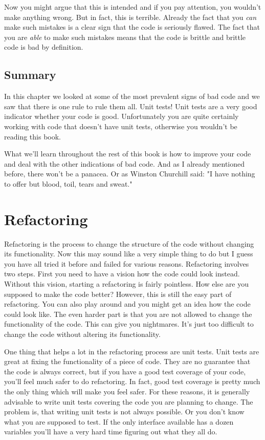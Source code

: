 Now you might argue that this is intended and if you pay attention, you wouldn't make anything wrong. But in fact, this is terrible. Already the fact that you \textit{can} make such mistakes is a clear sign that the code is seriously flawed. The fact that you are \textit{able} to make such mistakes means that the code is brittle and brittle code is bad by definition.

\section{Summary}

In this chapter we looked at some of the most prevalent signs of bad code and we saw that there is one rule to rule them all. Unit tests! Unit tests are a very good indicator whether your code is good. Unfortunately you are quite certainly working with code that doesn't have unit tests, otherwise you wouldn't be reading this book.

What we'll learn throughout the rest of this book is how to improve your code and deal with the other indications of bad code. And as I already mentioned before, there won't be a panacea. Or as Winston Churchill said: "I have nothing to offer but blood, toil, tears and sweat."

\chapter{Refactoring}

Refactoring is the process to change the structure of the code without changing its functionality. Now this may sound like a very simple thing to do but I guess you have all tried it before and failed for various reasons. Refactoring involves two steps. First you need to have a vision how the code could look instead. Without this vision, starting a refactoring is fairly pointless. How else are you supposed to make the code better? However, this is still the easy part of refactoring. You can also play around and you might get an idea how the code could look like. The even harder part is that you are not allowed to change the functionality of the code. This can give you nightmares. It's just too difficult to change the code without altering its functionality.

One thing that helps a lot in the refactoring process are unit tests. Unit tests are great at fixing the functionality of a piece of code. They are no guarantee that the code is always correct, but if you have a good test coverage of your code, you'll feel much safer to do refactoring. In fact, good test coverage is pretty much the only thing which will make you feel safer. For these reasons, it is generally advisable to write unit tests covering the code you are planning to change. The problem is, that writing unit tests is not always possible. Or you don't know what you are supposed to test. If the only interface available has a dozen variables you'll have a very hard time figuring out what they all do.

